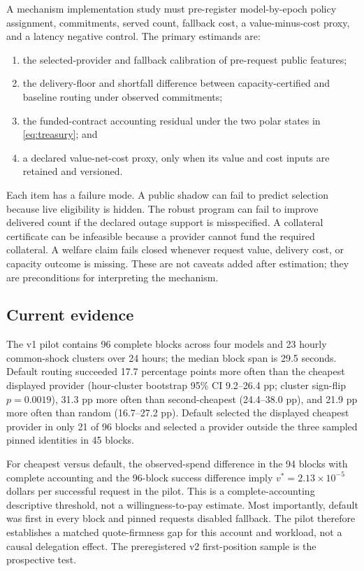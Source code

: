 \documentclass[11pt]{article}
\theoremstyle{definition}
\begin{document}
A mechanism implementation study must pre-register model-by-epoch policy
assignment, commitments, served count, fallback cost, a value-minus-cost proxy,
and a latency negative control. The primary estimands are:
\begin{enumerate}
  \item the selected-provider and fallback calibration of pre-request public
  features;
  \item the delivery-floor and shortfall difference between capacity-certified
  and baseline routing under observed commitments;
  \item the funded-contract accounting residual under the two polar states in
  \cref{eq:treasury}; and
  \item a declared value-net-cost proxy, only when its value and cost inputs are
  retained and versioned.
\end{enumerate}
Each item has a failure mode. A public shadow can fail to predict selection
because live eligibility is hidden. The robust program can fail to improve
delivered count if the declared outage support is misspecified. A collateral
certificate can be infeasible because a provider cannot fund the required
collateral. A welfare claim fails closed whenever request value, delivery cost,
or capacity outcome is missing. These are not caveats added after estimation;
they are preconditions for interpreting the mechanism.

\subsection{Current evidence}

The v1 pilot contains 96 complete blocks across four models and 23 hourly
common-shock clusters over 24 hours; the median block span is 29.5 seconds.
Default routing succeeded 17.7 percentage points more often than the cheapest
displayed provider (hour-cluster bootstrap 95\% CI 9.2--26.4 pp; cluster
sign-flip $p=0.0019$), 31.3 pp more often than second-cheapest (24.4--38.0 pp),
and 21.9 pp more often than random (16.7--27.2 pp). Default selected the
displayed cheapest provider in only 21 of 96 blocks and selected a provider
outside the three sampled pinned identities in 45 blocks.

For cheapest versus default, the observed-spend difference in the 94 blocks
with complete accounting and the 96-block success difference imply
$v^*=2.13\times10^{-5}$ dollars per successful request in the pilot. This is a
complete-accounting descriptive threshold, not a willingness-to-pay estimate.
Most importantly, default was first in every block and pinned requests disabled
fallback. The pilot therefore establishes a matched quote-firmness gap for this
account and workload, not a causal delegation effect. The preregistered v2
first-position sample is the prospective test.
\end{document}
